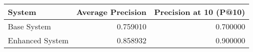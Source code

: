 \begin{tabular}{lrr}
\toprule
System & Average Precision & Precision at 10 (P@10) \\
\midrule
Base System & 0.759010 & 0.700000 \\
Enhanced System & 0.858932 & 0.900000 \\
\bottomrule
\end{tabular}

